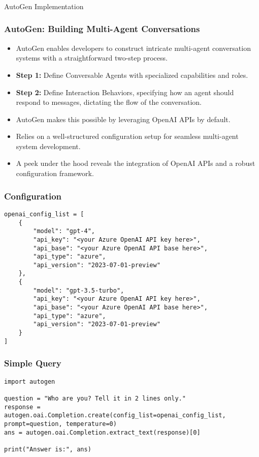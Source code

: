 \begin{frame}[fragile]\frametitle{}
\begin{center}
{\Large AutoGen Implementation}
\end{center}
\end{frame}


\begin{frame}[fragile]\frametitle{AutoGen: Building Multi-Agent Conversations}
  \begin{itemize}
    \item AutoGen enables developers to construct intricate multi-agent conversation systems with a straightforward two-step process.
    \item \textbf{Step 1:} Define Conversable Agents with specialized capabilities and roles.
    \item \textbf{Step 2:} Define Interaction Behaviors, specifying how an agent should respond to messages, dictating the flow of the conversation.
    \item AutoGen makes this possible by leveraging OpenAI APIs by default.
    \item Relies on a well-structured configuration setup for seamless multi-agent system development.
    \item A peek under the hood reveals the integration of OpenAI APIs and a robust configuration framework.
  \end{itemize}
\end{frame}

\begin{frame}[fragile]\frametitle{Configuration}
  \begin{lstlisting}
openai_config_list = [
    {
        "model": "gpt-4",
        "api_key": "<your Azure OpenAI API key here>",
        "api_base": "<your Azure OpenAI API base here>",
        "api_type": "azure",
        "api_version": "2023-07-01-preview"
    },
    {
        "model": "gpt-3.5-turbo",
        "api_key": "<your Azure OpenAI API key here>",
        "api_base": "<your Azure OpenAI API base here>",
        "api_type": "azure",
        "api_version": "2023-07-01-preview"
    }
]
  \end{lstlisting}
\end{frame}

\begin{frame}[fragile]\frametitle{Simple Query}
  \begin{lstlisting}
import autogen

question = "Who are you? Tell it in 2 lines only."
response = autogen.oai.Completion.create(config_list=openai_config_list, prompt=question, temperature=0)
ans = autogen.oai.Completion.extract_text(response)[0]

print("Answer is:", ans)
  \end{lstlisting}
\end{frame}


